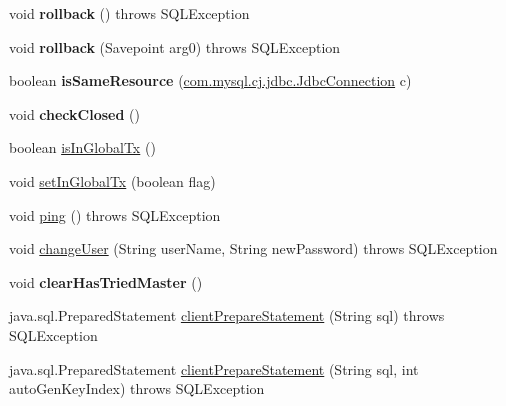 \begin{DoxyCompactItemize}
void {\bfseries rollback} ()  throws S\+Q\+L\+Exception 
\item 
\mbox{\label{classcom_1_1mysql_1_1cj_1_1jdbc_1_1_connection_wrapper_a279d20acb7eddf24fa3fa690e45a751d}} 
void {\bfseries rollback} (Savepoint arg0)  throws S\+Q\+L\+Exception 
\item 
\mbox{\label{classcom_1_1mysql_1_1cj_1_1jdbc_1_1_connection_wrapper_acd74fbc5622af14b9cc8e7da8aba5d7a}} 
boolean {\bfseries is\+Same\+Resource} (\mbox{\hyperlink{interfacecom_1_1mysql_1_1cj_1_1jdbc_1_1_jdbc_connection}{com.\+mysql.\+cj.\+jdbc.\+Jdbc\+Connection}} c)
\item 
\mbox{\label{classcom_1_1mysql_1_1cj_1_1jdbc_1_1_connection_wrapper_a071813afb9b56c08fa663b1d429c8def}} 
void {\bfseries check\+Closed} ()
\item 
boolean \mbox{\hyperlink{classcom_1_1mysql_1_1cj_1_1jdbc_1_1_connection_wrapper_a939c7730de2849e54b9b121adb1cdaa3}{is\+In\+Global\+Tx}} ()
\item 
void \mbox{\hyperlink{classcom_1_1mysql_1_1cj_1_1jdbc_1_1_connection_wrapper_adb320c4558060ee9dae32dc4d4310beb}{set\+In\+Global\+Tx}} (boolean flag)
\item 
void \mbox{\hyperlink{classcom_1_1mysql_1_1cj_1_1jdbc_1_1_connection_wrapper_af9d635c00b09fc14bff63eeeec9b354d}{ping}} ()  throws S\+Q\+L\+Exception 
\item 
void \mbox{\hyperlink{classcom_1_1mysql_1_1cj_1_1jdbc_1_1_connection_wrapper_a326d50e31598342bcc2c4273967f3020}{change\+User}} (String user\+Name, String new\+Password)  throws S\+Q\+L\+Exception 
\item 
\mbox{\label{classcom_1_1mysql_1_1cj_1_1jdbc_1_1_connection_wrapper_a8279c8cf76edfd6247bf3d3e2a969cae}} 
void {\bfseries clear\+Has\+Tried\+Master} ()
\item 
java.\+sql.\+Prepared\+Statement \mbox{\hyperlink{classcom_1_1mysql_1_1cj_1_1jdbc_1_1_connection_wrapper_abec439c58b0b01c1590be391a2d1969a}{client\+Prepare\+Statement}} (String sql)  throws S\+Q\+L\+Exception 
\item 
java.\+sql.\+Prepared\+Statement \mbox{\hyperlink{classcom_1_1mysql_1_1cj_1_1jdbc_1_1_connection_wrapper_a1dc0327172d67ed88fce75b54c5a87d8}{client\+Prepare\+Statement}} (String sql, int auto\+Gen\+Key\+Index)  throws S\+Q\+L\+Exception 

\end{DoxyCompactItemize}
